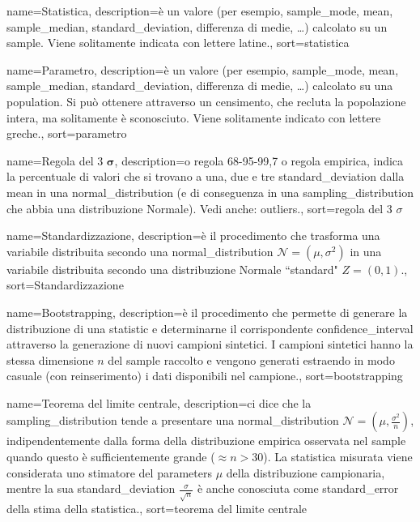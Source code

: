 {
	 name={Statistica},
	 description={\`e un valore  (per esempio, \gls{sample_mode}, \gls{mean}, \gls{sample_median}, \gls{standard_deviation}, differenza di medie, \dots) calcolato su un \gls{sample}. Viene solitamente indicata con lettere latine.},
	 sort={statistica}
}

{
	 name={Parametro},
	 description={\`e un valore (per esempio, \gls{sample_mode}, \gls{mean}, \gls{sample_median}, \gls{standard_deviation}, differenza di medie, \dots) calcolato su una \gls{population}. Si pu\`o ottenere attraverso un censimento, che recluta la popolazione intera, ma solitamente \`e sconosciuto. Viene solitamente indicato con lettere greche.},
	 sort={parametro}
}

{
	 name={Regola del 3 $\mathbf{\sigma}$},
	 description={o regola 68-95-99,7 o regola empirica, indica la percentuale di valori che si trovano a una, due e tre \gls{standard_deviation} dalla \gls{mean} in una \gls{normal_distribution} (e di conseguenza in una \gls{sampling_distribution} che abbia una distribuzione Normale). Vedi anche: \gls{outliers}.},
	 sort={regola del 3 $\sigma$}
}

{
	 name={Standardizzazione},
	 description={\`e il procedimento che trasforma una variabile distribuita secondo una \gls{normal_distribution}  $\mathcal{N} = (\mu, \sigma^2)$ in una variabile distribuita secondo una distribuzione Normale ``standard" $Z = (0,1)$.},
	 sort={Standardizzazione}
}



{
	 name={Bootstrapping},
	 description={\`e il procedimento che permette di generare la distribuzione di una \gls{statistic} e determinarne il corrispondente \gls{confidence_interval} attraverso la generazione di nuovi campioni sintetici. I campioni sintetici hanno la stessa dimensione $n$ del \gls{sample} raccolto e vengono generati estraendo in modo casuale (con reinserimento) i dati disponibili nel campione.},
	 sort={bootstrapping}
}

{
	 name={Teorema del limite centrale},
	 description={ci dice che la \gls{sampling_distribution} tende a presentare una \gls{normal_distribution} $\mathcal{N}=(\mu, \frac{\sigma^2}{n})$, indipendentemente dalla forma della distribuzione empirica osservata nel \gls{sample} quando questo \`e sufficientemente grande ($\approx n > 30$). La statistica misurata viene considerata uno stimatore del \gls{parameters} $\mu$ della distribuzione campionaria, mentre la sua \gls{standard_deviation} $\frac{\sigma}{\sqrt{n}}$ \`e anche conosciuta come \gls{standard_error} della stima della statistica.},
	 sort={teorema del limite centrale}
}

